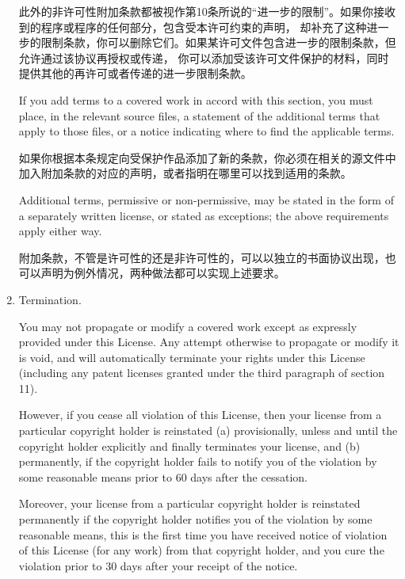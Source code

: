 \documentclass[11pt]{article}
\begin{document}
\begin{enumerate}
        此外的非许可性附加条款都被视作第10条所说的“进一步的限制”。如果你接收到的程序或程序的任何部分，包含受本许可约束的声明，
        却补充了这种进一步的限制条款，你可以删除它们。如果某许可文件包含进一步的限制条款，但允许通过该协议再授权或传递，
        你可以添加受该许可文件保护的材料，同时提供其他的再许可或者传递的进一步限制条款。

        If you add terms to a covered work in accord with this section, you
        must place, in the relevant source files, a statement of the
        additional terms that apply to those files, or a notice indicating
        where to find the applicable terms.

        如果你根据本条规定向受保护作品添加了新的条款，你必须在相关的源文件中加入附加条款的对应的声明，或者指明在哪里可以找到适用的条款。

        Additional terms, permissive or non-permissive, may be stated in the
        form of a separately written license, or stated as exceptions;
        the above requirements apply either way.

        附加条款，不管是许可性的还是非许可性的，可以以独立的书面协议出现，也可以声明为例外情况，两种做法都可以实现上述要求。

  \item Termination.

        You may not propagate or modify a covered work except as expressly
        provided under this License.  Any attempt otherwise to propagate or
        modify it is void, and will automatically terminate your rights under
        this License (including any patent licenses granted under the third
        paragraph of section 11).

        However, if you cease all violation of this License, then your
        license from a particular copyright holder is reinstated (a)
        provisionally, unless and until the copyright holder explicitly and
        finally terminates your license, and (b) permanently, if the copyright
        holder fails to notify you of the violation by some reasonable means
        prior to 60 days after the cessation.

        Moreover, your license from a particular copyright holder is
        reinstated permanently if the copyright holder notifies you of the
        violation by some reasonable means, this is the first time you have
        received notice of violation of this License (for any work) from that
        copyright holder, and you cure the violation prior to 30 days after
        your receipt of the notice.


\end{enumerate}
\end{document}
